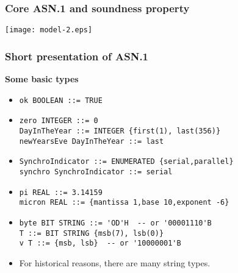 \documentclass[compress,dvips,xcolor={dvipsnames},t]{beamer}
\newcommand\ASN{\textsf{ASN.1}\xspace}
\begin{document}

\begin{frame}
\frametitle{Core \ASN and soundness property}

\centerline{\texttt{[image: model-2.eps]}}

\end{frame}


\begin{frame}[containsverbatim]
\frametitle{Short presentation of \ASN}

\noindent
\textbf{Some basic types}
\begin{itemize}

  \item \verb+ok BOOLEAN ::= TRUE+


  \item 

\begin{verbatim} 
zero INTEGER ::= 0 
DayInTheYear ::= INTEGER {first(1), last(356)}
newYearsEve DayInTheYear ::= last
\end{verbatim}

  \item 
\begin{verbatim}
SynchroIndicator ::= ENUMERATED {serial,parallel}
synchro SynchroIndicator ::= serial
\end{verbatim}

  \item

\begin{verbatim}
pi REAL ::= 3.14159
micron REAL ::= {mantissa 1,base 10,exponent -6}
\end{verbatim}

  \item 

\begin{verbatim}
byte BIT STRING ::= 'OD'H  -- or '00001110'B
T ::= BIT STRING {msb(7), lsb(0)}
v T ::= {msb, lsb}  -- or '10000001'B
\end{verbatim}



  \item For historical reasons, there are many string types.

\end{itemize}

\end{frame}
\end{document}

